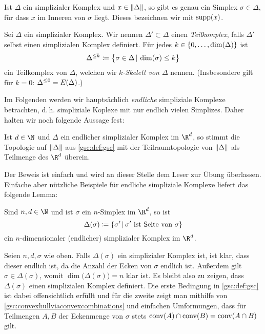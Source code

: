 \begin{thDef}[Träger]
    Ist $\Delta$ ein simplizialer Komplex und $x\in\lVert\Delta\rVert$, so gibt es
    genau ein Simplex $\sigma\in\Delta$, für dass $x$ im Inneren von $\sigma$
    liegt. Dieses bezeichnen wir mit $\operatorname{supp}(x)$.
\end{thDef}

\begin{thDef}
    Sei $\Delta$ ein simplizialer Komplex. Wir nennen $\Delta'\subset\Delta$
    einen \emph{Teilkomplex}, falls $\Delta'$ selbst einen simplizialen Komplex
    definiert.
    Für jedes $k\in\{0,\ldots,\dim(\Delta)\}$ ist
    \[ \skeleton\Delta{k} 
        \defeq \bigl\{ \sigma\in\Delta \Mid \dim(\sigma)\leq k \bigr\}
    \]
    ein Teilkomplex von $\Delta$, welchen wir \emph{$k$-Skelett von $\Delta$}
    nennen. (Insbesondere gilt für $k=0$: $\Delta^{\leq0} = E(\Delta)$.)
\end{thDef}

\bigskip
Im Folgenden werden wir hauptsächlich \emph{endliche} simpliziale Komplexe
betrachten, d.\,h. simpliziale Koplexe mit nur endlich vielen Simplizes. Daher
halten wir noch folgende Aussage fest:

\begin{thLemma}
    Ist $d\in\N$ und $\Delta$ ein endlicher simplizialer Komplex im $\R^d$, 
    so stimmt die Topologie auf $\lVert\Delta\rVert$ aus \cref{gsc:def:gsc} mit 
    der Teilraumtopologie von $\lVert\Delta\rVert$ als Teilmenge des $\R^d$
    überein.
\end{thLemma}

Der Beweis ist einfach und wird an dieser Stelle dem Leser zur Übung überlassen.
Einfache aber nützliche Beispiele für endliche simpliziale Komplexe liefert das
folgende Lemma:

\begin{thLemma}
    Sind $n,d\in\N$ und ist $\sigma$ ein $n$-Simplex im $\R^d$, so ist
    \[ \Delta(\sigma) 
        \defeq \{ \sigma' \Mid \sigma' \text{ ist Seite von } \sigma \}
    \]
    ein $n$-dimensionaler (endlicher) simplizialer Komplex im $\R^d$.
\end{thLemma}

\begin{proofsketch}
    Seien $n,d,\sigma$ wie oben. Falls $\Delta(\sigma)$ ein simplizialer Komplex
    ist, ist klar, dass dieser endlich ist, da die Anzahl der Ecken von $\sigma$
    endlich ist. Außerdem gilt $\sigma\in\Delta(\sigma)$, womit
    $\dim\bigl(\Delta(\sigma)\bigr) = n$ klar ist. Es bleibt also zu zeigen,
    dass $\Delta(\sigma)$ einen simplizialen Komplex definiert. Die erste
    Bedingung in \cref{gsc:def:gsc} ist dabei offensichtlich erfüllt und für die
    zweite zeigt man mithilfe von \cref{gsc:convexhullviaconvexcombinations} 
    und einfachen Umformungen, dass für Teilmengen $A,B$ der
    Eckenmenge von $\sigma$ stets $\operatorname{conv}(A)\cap\operatorname{conv}(B) = \operatorname{conv}(A\cap B)$ gilt.
    \\
\end{proofsketch}

